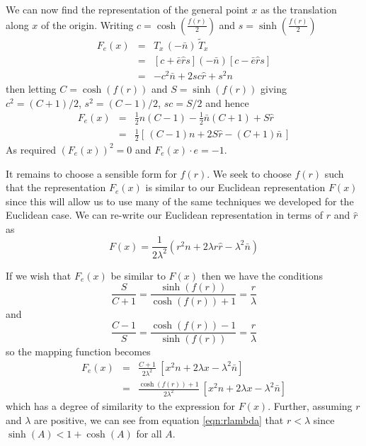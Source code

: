 We can now find the representation of the general point $x$ as the translation
along $x$ of the origin. Writing $c = \cosh\left(\frac{f(r)}{2}\right)$ and
$s = \sinh\left(\frac{f(r)}{2}\right)$
\begin{eqnarray}
F_e(x) & = & T_x\,(-\bar{n})\,\tilde{T}_x \\
& = & \left[c + \bar{e}\hat{r}s\right] (-\bar{n}) \left[c - \bar{e}\hat{r}s\right] \\
&=& -c^2\bar{n} + 2sc\hat{r} + s^2n 
\end{eqnarray}
then letting $C = \cosh(f(r))$ and $S = \sinh(f(r))$ giving $c^2 = (C+1) / 2$,
$s^2 = (C-1)/2$, $sc = S/2$ and hence
\begin{eqnarray}
F_e(x) & = & \frac{1}{2}n (C-1) - \frac{1}{2}\bar{n}(C+1) + S\hat{r} \\
& = & \frac{1}{2} \left[ \, (C-1)n + 2S\hat{r} - (C+1)\bar{n} \, \right] 
\end{eqnarray}
As required $(F_e(x))^2 = 0$ and $F_e(x) \cdot e = -1$.

It remains to choose a sensible form for $f(r)$. We seek to choose $f(r)$ such that
the representation $F_e(x)$ is similar to our Euclidean representation $F(x)$
since this will allow us to use many of the same techniques we developed for the
Euclidean case. We can re-write our Euclidean representation 
in terms of $r$ and $\hat{r}$ as
\begin{equation}
F(x) = \frac{1}{2\lambda^2}(r^2n + 2 \lambda r\hat{r} - \lambda^2\bar{n})
\label{eqn:nonEuclidMap1}
\end{equation}

If we wish that $F_e(x)$ be similar to $F(x)$ then we have the conditions
\begin{equation}
\frac{S}{C + 1} = \frac{\sinh(f(r))}{\cosh(f(r)) + 1} = \frac{r}{\lambda}
\label{eqn:rlambda}
\end{equation}
and
\begin{equation}
\frac{C-1}{S} = \frac{\cosh(f(r)) - 1}{\sinh(f(r))} = \frac{r}{\lambda}
\label{eqn:rlambda2}
\end{equation}
so the mapping function becomes
\begin{eqnarray}
F_e(x) &=& \frac{C+1}{2\lambda^2}\ [x^2n + 2\lambda x - \lambda^2 \bar{n}] \\
&=& \frac{\cosh(f(r)) + 1}{2\lambda^2}\ [x^2n + 2\lambda x - \lambda^2 \bar{n}]
\end{eqnarray}
which has a degree of similarity to the expression for $F(x)$. Further, 
assuming $r$ and $\lambda$ are positive, we can see from equation
\ref{eqn:rlambda} that $r < \lambda$ since $\sinh(A) < 1 + \cosh(A)$
for all $A$.

